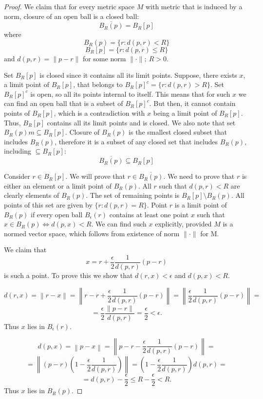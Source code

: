 \documentclass{article}
\begin{document}
\begin{proof}

We claim that for every metric space $M$ with metric that is induced by a norm, closure of an open ball is a closed ball:
$$ \overline{B_R(p)} = B_R[p] $$
where
$$ B_R(p) = \{ r : d(p, r) < R \} $$
$$ B_R[p] = \{ r : d(p, r) \leq R \} $$
and
$ d(p, r) = \| p-r \|$ for some norm $\| \cdot \|; \> R>0 $.

Set $B_R[p]$ is closed since it contains all its limit points. Suppose, there exists $x$, a limit point of $B_R[p]$, that belongs to $B_R[p]^c = \{ r: d(p, r) > R\}$. Set $B_R[p]^c$ is open, so all its points internal to itself. This means that for such $x$ we can find an open ball that is a subset of $B_R[p]^c$. But then, it cannot contain points of $B_R[p]$, which is a contradiction with $x$ being a limit point of $B_R[p]$. Thus, $B_R[p]$ contains all its limit points and is closed. We also note that set $B_R(p)m \subseteq B_R[p]$. Closure of $B_R(p)$ is the smallest closed subset that includes $B_R(p)$, therefore it is a subset of any closed set that includes $B_R(p)$, including $\subseteq B_R[p]$:
$$ \overline{B_R(p)} \subseteq B_R[p] $$

Consider $r \in B_R[p]$. We will prove that $r \in \overline{B_R(p)}$. We need to prove that $r$ is either an element or a limit point of $B_R(p)$. All $r$ such that $d(p, r) < R$ are clearly elements of $B_R(p)$. The set of remaining points is $B_R[p] \setminus B_R(p)$. All points of this set are given by $\{r: d(p, r) = R \}$. Point $r$ is a limit point of $B_R(p)$ if every open ball $B_\epsilon(r)$ contains at least one point $x$ such that $x \in B_R(p) \iff d(p, x) < R$. We can find such $x$ explicitly, provided $M$ is a normed vector space, which follows from existence of norm $\| \cdot \|$ for M.

We claim that 
$$ x = r + \frac{\epsilon}{2} \frac{1}{d(p, r)}(p-r) $$
is such a point. To prove this we show that $d(r, x) < \epsilon$ and $d(p, x) < R$.

$$ d(r, x) = \left\|r-x\right\| = \left\| r - r + \frac{\epsilon}{2}\frac{1}{d(p,r)}(p-r) \right\| = \left\| \frac{\epsilon}{2}\frac{1}{d(p,r)}(p-r) \right\| = $$
$$ = \frac{\epsilon}{2}\frac{\|p-r\|}{d(p,r)} = \frac{\epsilon}{2} < \epsilon. $$
Thus $x$ lies in $B_\epsilon(r)$.

$$ d(p, x) = \left\|p-x\right\| = \left\| p - r - \frac{\epsilon}{2}\frac{1}{d(p,r)}(p-r) \right\| = $$
$$ = \left\| (p - r)\left(1 - \frac{\epsilon}{2}\frac{1}{d(p,r)}\right) \right\| = \left(1 - \frac{\epsilon}{2}\frac{1}{d(p,r)}\right) d(p, r) = $$
$$ = d(p, r) - \frac{\epsilon}{2} \leq R - \frac{\epsilon}{2} < R. $$
Thus $x$ lies in $B_R(p)$.


\end{proof}
\end{document}
